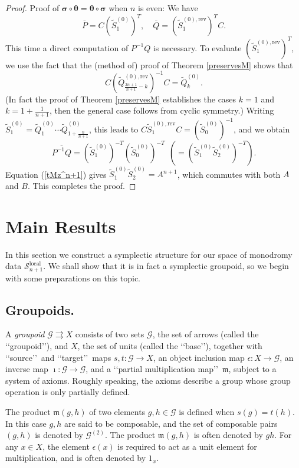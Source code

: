 \documentclass[a4paper,12pt,leqno]{amsart}
\numberwithin{equation}{section}
\theoremstyle{plain}
\theoremstyle{definition}
\newcommand{\si}{\sigma}
\newcommand{\eps}{\epsilon}
\renewcommand{\th}{\theta}
\newcommand{\m}{\mathfrak{m}}
\newcommand{\cS}{\mathcal{S}}
\newcommand{\cG}{\mathcal{G}}
\renewcommand{\ll}{\lq\lq}
\newcommand{\rr}{\rq\rq\ }
\newcommand{\rrr}{\rq\rq}
\newcommand{\tSz}{  \tilde S^{(0)}  }
\newcommand{\tQz}{  \tilde Q^{(0)}  }
\newcommand{\rra}{\rightrightarrows}
\newcommand{\bsi}{\boldsymbol\si}
\newcommand{\bth}{\boldsymbol\th}
\newcommand{\tQzr}{  \tilde Q^{(0),\text{rev}}  }
\newcommand{\tSzr}{  \tilde S^{(0),\text{rev}}  }
\begin{document}
\begin{proof}
Proof of $\bsi\circ\bth=\bth\circ\bsi$ when $n$ is even:
We have
\[
\bar P= C (\tSz_1)^T,
\quad
\bar Q= (\tSzr_1)^T C.
\]
This time a direct computation of $P^{-1}Q$ is necessary. To evaluate $(\tSzr_1)^T$,
we use the fact that the (method of) proof of Theorem \ref{preservesM} shows that
\[
C
\left(
\tQzr_{ \scriptstyle\frac{2n+1}{n+1}-k}
\right)^{-1}
C
=
\tQz_k.
\]
(In fact the proof of Theorem \ref{preservesM} establishes the cases $k=1$ and $k=
1+\scriptstyle\frac1{n+1}$, then the general case follows from cyclic symmetry.)
Writing  $\tSz_1=\tQz_1 \cdots \tQz_{1+\scriptstyle\frac n{n+1}}$, this
leads to $C  \tSzr_1 C= (\tSz_0)^{-1}$, and we obtain
\[
\overline{P^{-1}Q}= (\tSz_1)^{-T} (\tSz_0)^{-T} \ \ (=  (\tSz_1 \tSz_2)^{-T}).
\]
Equation (\ref{tMz^n+1}) gives
$\tSz_1 \tSz_2=A^{n+1}$, which commutes with both $A$ and $B$. This completes the proof.
\end{proof}




\section{Main Results}\label{symp}


In this section we construct a symplectic structure for our
space of monodromy data $\cS_{n+1}^{\text{local}}$. We shall show
that it is in fact a symplectic groupoid, so we begin with some preparations
on this topic.

\subsection{Groupoids.}\label{gpd}

A {\em groupoid} $\cG\rra X$ consists of two sets $\cG$, the set of arrows (called the \ll groupoid\rrr),  
and $X$, the set of units (called the \ll base\rrr), together with
\ll source\rr and \ll target\rr maps
$s,t:\cG\to X$, an object 
inclusion map
$\eps: X\to\cG$, an inverse map $\imath:\cG\to\cG$, and a
\ll partial multiplication map\rr $\m$, subject to a system of axioms.
Roughly speaking, the axioms describe a group whose group operation is only partially defined.


The product $\m(g,h)$ of two elements $g,h\in\cG$ is
defined when  $s(g) =t(h)$. In this case  $g,h$ are said to
be composable, and the set of composable pairs $(g,h)$ is
denoted by $\cG^{(2)}$.
The product $\m(g,h)$ is often denoted by $gh$.
For any $x\in X$, the element $\eps(x)$ is required to act as a unit element
for multiplication,
and is often denoted by $1_x$.
\end{document}
